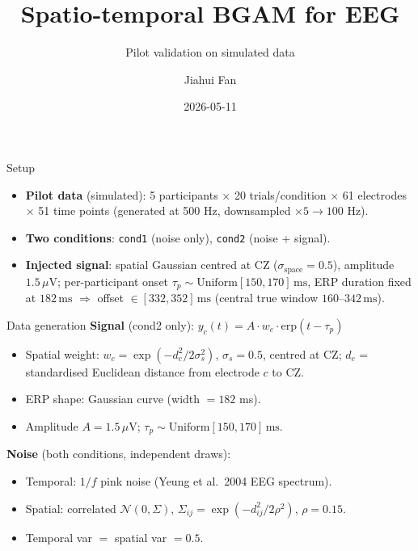 \documentclass[10pt,aspectratio=169]{beamer}
\title{Spatio-temporal BGAM for EEG}
\subtitle{Pilot validation on simulated data}
\author{Jiahui Fan}
\date{2026-05-11}
\begin{document}
\maketitle

\begin{frame}{Setup}
  \begin{itemize}
    \item \textbf{Pilot data} (simulated): 5 participants
          $\times$ 20 trials/condition $\times$ 61 electrodes
          $\times$ 51 time points (generated at 500 Hz,
          downsampled $\times 5 \to 100$ Hz).
    \item \textbf{Two conditions}: \texttt{cond1} (noise only),
          \texttt{cond2} (noise + signal).
    \item \textbf{Injected signal}: spatial Gaussian centred at CZ
          ($\sigma_{\text{space}} = 0.5$), amplitude $1.5\,\mu\mathrm{V}$;
          per-participant onset
          $\tau_p \sim \mathrm{Uniform}[150, 170]\,\mathrm{ms}$,
          ERP duration fixed at $182\,\mathrm{ms}$
          $\Rightarrow$ offset $\in [332, 352]\,\mathrm{ms}$
          (central true window $160$--$342\,\mathrm{ms}$).
  \end{itemize}
\end{frame}

\begin{frame}{Data generation}
  \textbf{Signal} (cond2 only):
  $y_c(t) = A \cdot w_c \cdot \mathrm{erp}(t - \tau_p)$
  \begin{itemize}\setlength{\itemsep}{0pt}
    \item Spatial weight: $w_c = \exp(-d_c^2 / 2\sigma_s^2)$,
          $\sigma_s = 0.5$, centred at CZ;
          $d_c$ = standardised Euclidean distance
          from electrode $c$ to CZ.
    \item ERP shape: Gaussian curve (width $= 182$ ms).
    \item Amplitude $A = 1.5\,\mu\mathrm{V}$;
          $\tau_p \sim \mathrm{Uniform}[150, 170]\,\mathrm{ms}$.
  \end{itemize}

  \vspace{0.3em}
  \textbf{Noise} (both conditions, independent draws):
  \begin{itemize}\setlength{\itemsep}{0pt}
    \item Temporal: $1/f$ pink noise
          (Yeung et al.\ 2004 EEG spectrum).
    \item Spatial: correlated $\mathcal{N}(0, \Sigma)$,
          $\Sigma_{ij} = \exp(-d_{ij}^2 / 2\rho^2)$, $\rho = 0.15$.
    \item Temporal var $=$ spatial var $= 0.5$.
  \end{itemize}
\end{frame}
\end{document}
